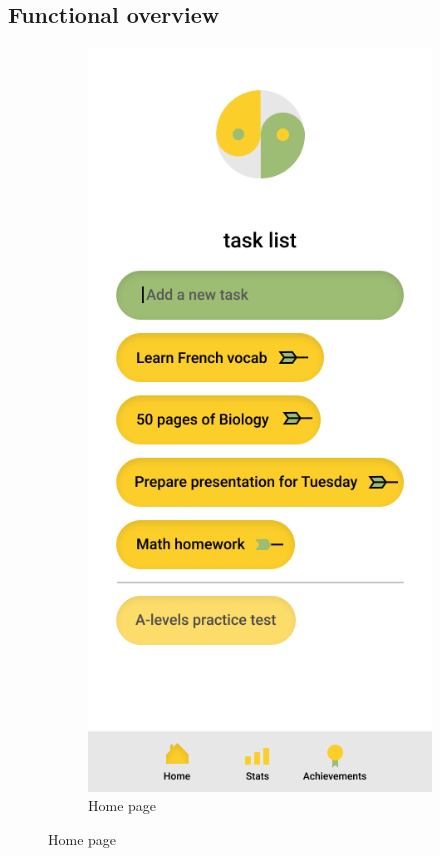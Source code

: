 \subsection{Functional overview}
\begin{figure}[htb!]
    \begin{center}
        \begin{subfigure}{.3\textwidth}
            \centering
            \includegraphics[width=0.8\linewidth]{images/sage_home.png}
            \caption{Home page}
            \label{fig:old_sage_home}

\end{subfigure}
\end{center}
\end{figure}
